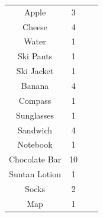 \documentclass[12pt, a4paper]{article}
\begin{document}
\begin{table}[H]
\begin{tabular}{|c|c|c|c|}
			\cline{1-2}
			Apple & 3 &  &  \\
			\cline{1-2}
			Cheese & 4 &  &  \\
			\cline{1-2}
			Water & 1 &  &  \\
			\cline{1-2}
			Ski Pants & 1 &  &  \\
			\cline{1-2}
			Ski Jacket & 1 &  &  \\
			\cline{1-2}
			Banana & 4 &  &  \\
			\cline{1-2}
			Compass & 1 &  &  \\
			\cline{1-2}
			Sunglasses & 1 &  &  \\
			\cline{1-2}
			Sandwich & 4 &  &  \\
			\cline{1-2}
			Notebook & 1 &  &  \\
			\cline{1-2}
			Chocolate Bar & 10 &  &  \\
			\cline{1-2}
			Suntan Lotion & 1 &  &  \\
			\cline{1-2}
			Socks & 2 &  &  \\
			\cline{1-2}
			Map & 1 &  &  \\
			\hline
		\end{tabular}
		\label{tab:example2}
	\end{table}	
\end{document}
